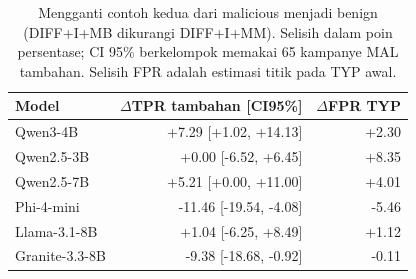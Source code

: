 \begin{table}[t]
\centering\small
\caption{Mengganti contoh kedua dari malicious menjadi benign (DIFF+I+MB dikurangi DIFF+I+MM). Selisih dalam poin persentase; CI 95\% berkelompok memakai 65 kampanye MAL tambahan. Selisih FPR adalah estimasi titik pada TYP awal.}
\label{tab:contrast}
\begin{tabular}{lrr}
\toprule
Model & $\Delta$TPR tambahan [CI95\%] & $\Delta$FPR TYP \\
\midrule
Qwen3-4B & +7.29 [+1.02, +14.13] & +2.30 \\
Qwen2.5-3B & +0.00 [-6.52, +6.45] & +8.35 \\
Qwen2.5-7B & +5.21 [+0.00, +11.00] & +4.01 \\
Phi-4-mini & -11.46 [-19.54, -4.08] & -5.46 \\
Llama-3.1-8B & +1.04 [-6.25, +8.49] & +1.12 \\
Granite-3.3-8B & -9.38 [-18.68, -0.92] & -0.11 \\
\bottomrule
\end{tabular}
\end{table}
